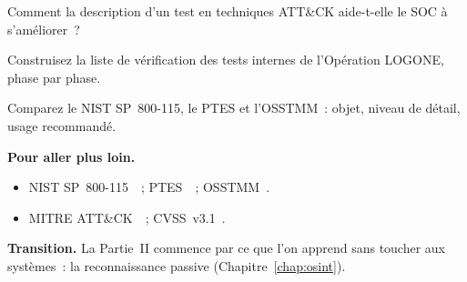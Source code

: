 \begin{boxexo}[title={\ding{45}\quad Exercice~4.8. ATT\&CK et SOC \niveaumoyen}]
Comment la description d'un test en techniques ATT\&CK aide-t-elle le SOC
à s'améliorer~?
\end{boxexo}

\begin{boxexo}[title={\ding{45}\quad Exercice~4.9. Liste de vérification \niveauexpert}]
Construisez la liste de vérification des tests internes de l'Opération
LOGONE, phase par phase.
\end{boxexo}

\begin{boxexo}[title={\ding{45}\quad Exercice~4.10. Comparer \niveauexpert}]
Comparez le NIST SP~800-115, le PTES et l'OSSTMM~: objet, niveau de détail,
usage recommandé.
\end{boxexo}

\bigskip

\begin{boxinfo}
\textbf{Pour aller plus loin.}
\begin{itemize}
    \item NIST SP~800-115~\cite{nist800115}~; PTES~\cite{ptes}~; OSSTMM~\cite{osstmm3}.
    \item MITRE ATT\&CK~\cite{mitreattack}~; CVSS~v3.1~\cite{first2019cvss31}.
\end{itemize}
\end{boxinfo}

\begin{boxinfo}
\textbf{Transition.} La Partie~II commence par ce que l'on apprend sans
toucher aux systèmes~: la reconnaissance passive (Chapitre~\ref{chap:osint}).
\end{boxinfo}
